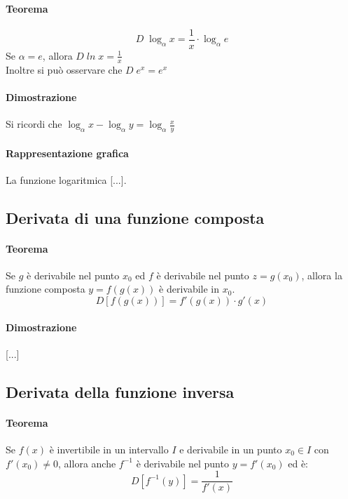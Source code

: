\documentclass[a4paper,14pt]{extarticle}
\begin{document}
\paragraph{Teorema \\} \[ D\;\log_\alpha x = \frac{1}{x} \cdot \log_\alpha e  \] Se $\alpha = e$, allora $D\;ln\;x = \frac{1}{x}$ \\ Inoltre si può osservare che $D\;e^x = e^x$
\paragraph{Dimostrazione \\} Si ricordi che $\log_\alpha x - \log_\alpha y = \log_\alpha \frac{x}{y}$
\paragraph{Rappresentazione grafica \\}
La funzione logaritmica [...].

\subsection{Derivata di una funzione composta}
\paragraph{Teorema \\} Se $g$ è derivabile nel punto $x_0$ ed $f$ è derivabile nel punto $z=g(x_0)$, allora la funzione composta $y=f(g(x))$ è derivabile in $x_0$. \large \[ D[f(g(x))]=f'(g(x)) \cdot g'(x) \] \normalsize

\paragraph{Dimostrazione \\}
[...]

\subsection{Derivata della funzione inversa}
\paragraph{Teorema \\} Se $f(x)$ è invertibile in un intervallo $I$ e derivabile in un punto $x_0 \in I$ con $f'(x_0) \ne 0$, allora anche $f^{-1}$ è derivabile nel punto $y=f'(x_0)$ ed è: \large \[ D[f^{-1}(y)]=\frac{1}{f'(x)} \] \normalsize
\end{document}

